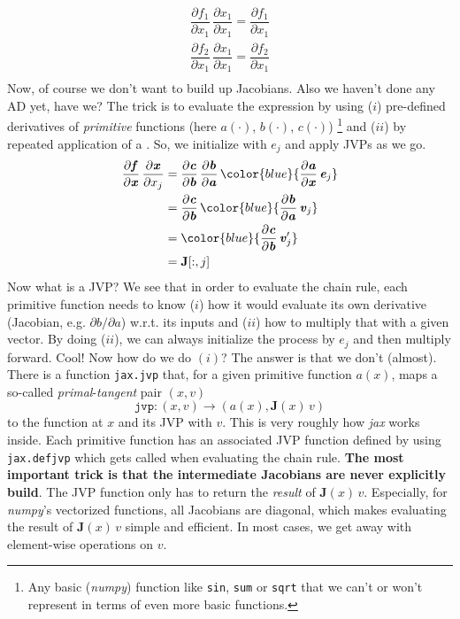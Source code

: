 \documentclass[parskip,paper=a4,11pt,headsepline]{scrartcl}
\newcommand{\ve}[1]{\ensuremath{\bm{\mathit{#1}}}}
\newcommand{\ma}[1]{\ensuremath{\bm{\mathbf{#1}}}}
\newcommand{\ra}{\ensuremath{\rightarrow}}
\newcommand{\pd}[2]{\dfrac{\partial #1}{\partial #2}}
\newcommand{\pdi}[2]{\partial #1/\partial #2}
\newcommand{\blue}[1]{{\color{blue}{#1}}}
\newcommand{\soft}[1]{\textsl{#1}\xspace}
\newcommand{\numpy}{\soft{numpy}}
\newcommand{\jax}{\soft{jax}}
\newcommand{\co}[1]{\texttt{#1}}
\begin{document}
\begin{gather*}
    \pd{f_1}{x_1}\,\pd{x_1}{x_1} = \pd{f_1}{x_1} \\
    \pd{f_2}{x_1}\,\pd{x_1}{x_1} = \pd{f_2}{x_1} \\
\end{gather*}
Now, of course we don't want to build up Jacobians. Also we haven't done any AD
yet, have we? The trick is to evaluate the expression by using ($i$)
pre-defined derivatives of \emph{primitive} functions (here $\ve a(\cdot)$,
$\ve b(\cdot)$, $\ve c(\cdot)$)%
\footnote{Any basic (\numpy) function like \co{sin}, \co{sum}
or \co{sqrt} that we can't or won't represent in terms of even more basic
functions.}
and ($ii$) by repeated application of a
\blue{\emph{Jacobian vector product (JVP)}}. So, we initialize with $\ve e_j$
and apply JVPs as we go.
\begin{align*}
    \pd{\ve f}{\ve x}\,\pd{\ve x}{x_j}
        &= \pd{\ve c}{\ve b}\,\pd{\ve b}{\ve a}\,\blue{\pd{\ve a}{\ve x}\,\ve e_j} \\
        &= \pd{\ve c}{\ve b}\,\blue{\pd{\ve b}{\ve a}\,\ve v_j} \\
        &= \blue{\pd{\ve c}{\ve b}\,\ve v_j'} \\
        &= \ma J[:,j]
\end{align*}
Now what is a JVP? We see that in order to evaluate the chain rule, each
primitive function
needs to know ($i$) how it would evaluate its own derivative (Jacobian, e.g.
$\pdi{\ve b}{\ve a}$) w.r.t. its inputs and ($ii$) how to multiply that with a
given vector. By doing ($ii$), we can always initialize the process by $\ve
e_j$ and then multiply forward. Cool! Now how do we do $(i)$? The answer is
that we don't (almost). There is a function \co{jax.jvp} that, for a given
primitive function $\ve a(\ve x)$, maps a so-called
\emph{primal}-\emph{tangent} pair $(\ve x, \ve v)$
\begin{equation*}
    \co{jvp}: (\ve x, \ve v) \ra \left(\ve a(\ve x), \ma J(\ve x)\,\ve v\right)
\end{equation*}
to the function at $\ve x$ and its JVP with $\ve v$. This is very roughly how
\jax works inside. Each primitive function has an associated
JVP function defined by using \co{jax.defjvp} which gets called when evaluating
the chain rule. \textbf{The most important trick is that the intermediate
Jacobians are never explicitly build}. The JVP function only has to return the
\emph{result} of $\ma J(\ve x)\,\ve v$. Especially, for \numpy's vectorized
functions, all Jacobians are diagonal, which makes evaluating the result of $\ma J(\ve x)\,\ve v$
simple and efficient. In most cases, we get away with element-wise operations
on \ve v.
\end{document}
